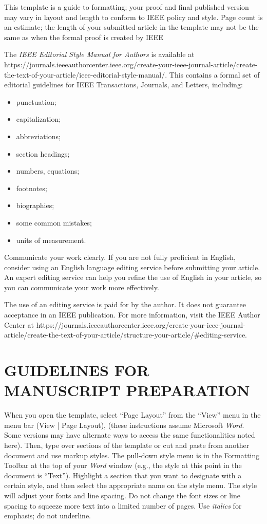 \documentclass[correspondence]{IEEEtaes}
\begin{document}
This template is a guide to formatting; your proof and final published version may vary in layout and length to conform to IEEE policy and style. Page count is an estimate; the length of your submitted article in the template may not be the same as when the formal proof is created by IEEE

The {\it IEEE Editorial Style Manual for Authors} is available at {https://journals.ieeeauthorcenter.ieee.org/create-your-ieee-journal-article/create-the-text-of-your-article/ieee-editorial-style-manual/}. This contains a formal set of editorial guidelines for IEEE Transactions, Journals, and Letters, including:
\begin{itemize}
\item punctuation;
\item capitalization;
\item abbreviations;
\item section headings;
\item numbers, equations;
\item footnotes;
\item biographies;
\item some common mistakes;
\item units of measurement.
\end{itemize}

Communicate your work clearly. If you are not fully proficient in English, consider using an English language editing service before submitting your article. An expert editing service can help you refine the use of English in your article, so you can communicate your work more effectively.

The use of an editing service is paid for by the author. It does not guarantee acceptance in an IEEE publication. For more information, visit the IEEE Author Center at {https://journals.ieeeauthorcenter.ieee.org/create-your-ieee-journal-article/create-the-text-of-your-article/structure-your-article/\#editing-service}.

\section{GUIDELINES FOR MANUSCRIPT PREPARATION}

When you open the template, select ``Page Layout'' from the ``View'' menu in the menu bar (View | Page Layout), (these instructions assume Microsoft {\it Word}. Some versions may have alternate ways to access the same functionalities noted here). Then, type over sections of the template or cut and paste from another document and use markup styles. The pull-down style menu is in the Formatting Toolbar at the top of your {\it Word} window (e.g., the style at this point in the document is ``Text''). Highlight a section that you want to designate with a certain style, and then select the appropriate name on the style menu. The style will adjust your fonts and line spacing. Do not change the font sizes or line spacing to squeeze more text into a limited number of pages. Use {\it italics} for emphasis; do not underline.
\end{document}
